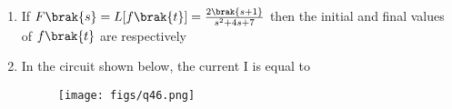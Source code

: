 \documentclass[a4paper, 11pt]{article}
\begin{document}
\begin{enumerate}
    \begin{enumerate}
    \end{enumerate}

    \hfill{}

    \item If $F\brak{s}=L[f\brak{t}]=\frac{2\brak{s+1}}{s^{2}+4s+7}$ then the initial and final values of $f\brak{t}$ are respectively
    
    \begin{enumerate}
    \end{enumerate}
    
    \hfill{}

    \item In the circuit shown below, the current I is equal to
    
    \begin{figure}[H]
        \centering
        \texttt{[image: figs/q46.png]}
        \caption*{}
        \label{fig:q46}
    \end{figure}
    
    \begin{enumerate}
    \end{enumerate}
    
    \hfill{}


\end{enumerate}
\end{document}
